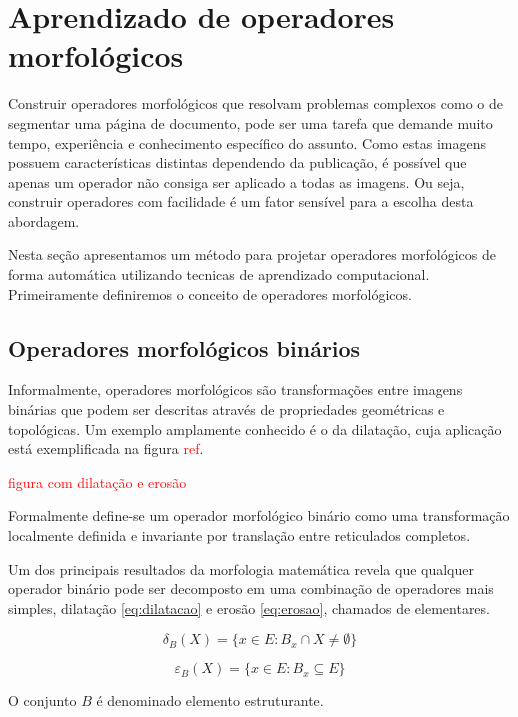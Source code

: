 \documentclass[a4paper,11pt]{article}
\newcommand{\TODO}[1]{\textcolor{red}{#1}}
\begin{document}
\section{Aprendizado de operadores morfológicos}

Construir operadores morfológicos que resolvam problemas complexos como o de segmentar uma página de documento, pode ser uma tarefa que demande muito tempo, experiência e conhecimento específico do assunto. Como estas imagens possuem características distintas dependendo da publicação, é possível que apenas um operador não consiga ser aplicado a todas as imagens. Ou seja, construir operadores com facilidade é um fator sensível para a escolha desta abordagem.

Nesta seção apresentamos um método para projetar operadores morfológicos de forma automática utilizando tecnicas de aprendizado computacional. Primeiramente definiremos o conceito de operadores morfológicos.

\subsection{Operadores morfológicos binários}

Informalmente, operadores morfológicos são transformações entre imagens binárias que podem ser descritas através de propriedades geométricas e topológicas. Um exemplo amplamente conhecido é o da  dilatação, cuja aplicação está exemplificada na figura \TODO{ref}.

\TODO{figura com dilatação e erosão}

Formalmente define-se um operador morfológico binário como uma transformação localmente definida e invariante por translação entre reticulados completos.

Um dos principais resultados da morfologia matemática revela que qualquer operador binário pode ser decomposto em uma combinação de operadores mais simples, dilatação \eqref{eq:dilatacao} e erosão \eqref{eq:erosao}, chamados de elementares.

\begin{equation}
  \label{eq:dilatacao}
  \delta_{B}(X) = \{ x \in E \colon B_{x} \cap X \neq \emptyset \}
\end{equation}

\begin{equation}
  \label{eq:erosao}
  \varepsilon_{B}(X) = \{ x \in E \colon B_{x} \subseteq E \}
\end{equation}

O conjunto $B$ é denominado elemento estruturante.
\end{document}
